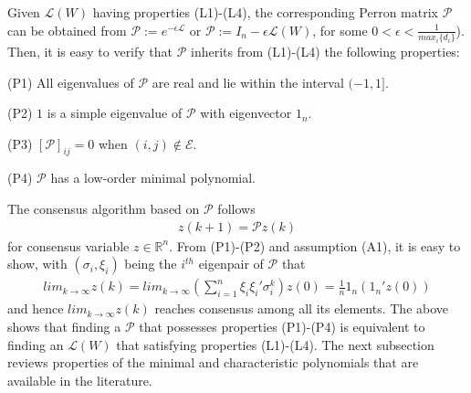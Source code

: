 \documentclass[onecolumn,reviewcopy]{autart}
\def \L{\mathcal{L}}
\def \E{\mathcal{E}}
\def \P{\mathcal{P}}
\begin{document}
Given $\L(W)$ having properties (L1)-(L4), the corresponding Perron matrix $\P$ can be obtained from $\P:=e^{-\epsilon\L}$ or
$\P :=I_n - \epsilon \L(W)$, for some $0<\epsilon < \frac{1}{max_i \{d_{i}\}}$). Then, it is easy to verify that $\P$ inherits
from (L1)-(L4) the following properties:
\begin{description}
  \item (P1) All eigenvalues of $\P$ are real and lie within the interval $(-1,1]$.
  \item (P2) $1$ is a simple eigenvalue of $\P$ with eigenvector $1_n$.
  \item (P3) $[\P]_{ij}=0$ when $(i,j) \notin \E$.
  \item (P4) $\P$ has a low-order minimal polynomial.
\end{description}
The consensus algorithm based on $\P$ follows
\begin{align}
z(k+1)=\P z(k) \label{eqn:zkplus1}
\end{align}
for consensus variable $z \in \mathbb{R}^n$. From (P1)-(P2) and assumption (A1), it is easy to show, with $(\sigma_i,\xi_i)$ being the $i^{th}$ eigenpair of $\P$ that
\begin{align}
lim_{k \rightarrow \infty} z(k) = lim_{k \rightarrow \infty} (\sum_{i=1}^n \xi_i \xi_i' \sigma_i^k)z(0) =\frac{1}{n} 1_n (1_n' z(0))
\end{align}
and hence $lim_{k \rightarrow \infty} z(k)$ reaches consensus among all its elements. The above shows that finding a $\P$ that possesses properties (P1)-(P4) is equivalent to finding an $\L(W)$ that satisfying properties (L1)-(L4). The next subsection reviews properties of the minimal and characteristic polynomials that are available in the literature.
\end{document}
